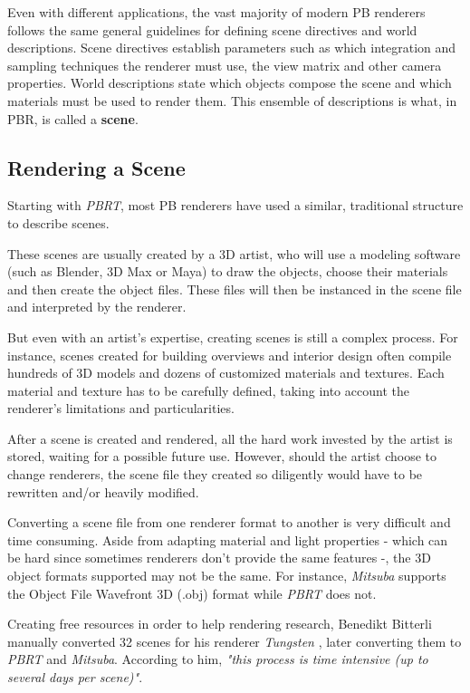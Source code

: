 Even with different applications, the vast majority of modern PB renderers 
follows the same general guidelines for defining scene directives and world 
descriptions. Scene directives establish parameters such as which integration 
and sampling techniques the renderer must use, the view matrix and other camera 
properties. World descriptions state which objects compose the scene and which 
materials must be used to render them. This ensemble of descriptions is what, in 
PBR, is called a \textbf{scene}.

\subsection{Rendering a Scene}
Starting with \textit{PBRT}, most PB renderers have used a similar, traditional​ 
structure to describe scenes.

These scenes are usually created by a 3D artist, who will use a modeling 
software (such as Blender, 3D Max or Maya) to draw the objects, choose their 
materials and then create the object files. These files will then be instanced 
in the scene file and interpreted by the renderer.

But even with an artist’s expertise, creating scenes is still a complex process. 
For instance, scenes created for building overviews and interior design often 
compile hundreds of 3D models and dozens of customized materials and textures. Each material and texture 
has to be carefully defined, taking into account the renderer's limitations and 
particularities.

After a scene is created and rendered, all the hard work invested by the artist 
is stored, waiting for a possible future use. However, should the artist choose 
to change renderers, the scene file they created so diligently would have to be 
rewritten and/or heavily modified.

Converting a scene file from one renderer format to another is very difficult 
and time consuming. Aside from adapting material and light properties - which 
can be hard since sometimes renderers don't provide the same features -, the 3D 
object formats supported may not be the same. For instance, \textit{Mitsuba} 
supports the Object File Wavefront 3D (.obj) format while \textit{PBRT} does 
not.

Creating free resources in order to help rendering research, Benedikt Bitterli 
\cite{resources16} manually converted 32 scenes for his renderer \textit{Tungsten} 
\cite{tungsten}, later converting them to \textit{PBRT} and \textit{Mitsuba}. 
According to him, \textit{"this process is time intensive (up to several days 
per scene)"}.